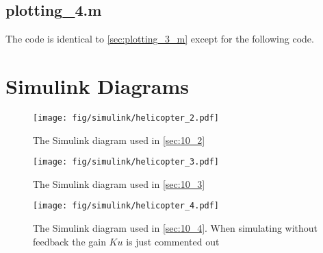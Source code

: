 \vspace{1cm}

\subsection{plotting\_4.m}\label{sec:plotting_4_m}
The code is identical to \cref{sec:plotting_3_m} except for the following code.


\clearpage
\section{Simulink Diagrams}\label{sec:simulink}
\begin{figure}[h]
	\centering
		\texttt{[image: fig/simulink/helicopter\_2.pdf]}
	\caption{The Simulink diagram used in \cref{sec:10_2}}
\label{fig:heli_2}
\end{figure}

\begin{figure}[h]
	\centering
		\texttt{[image: fig/simulink/helicopter\_3.pdf]}
	\caption{The Simulink diagram used in \cref{sec:10_3}}
\label{fig:heli_3}
\end{figure}

\begin{figure}[h]
	\centering
		\texttt{[image: fig/simulink/helicopter\_4.pdf]}
	\caption{The Simulink diagram used in \cref{sec:10_4}. When simulating without feedback the gain $Ku$ is just commented out}
\label{fig:heli_4}
\end{figure}
